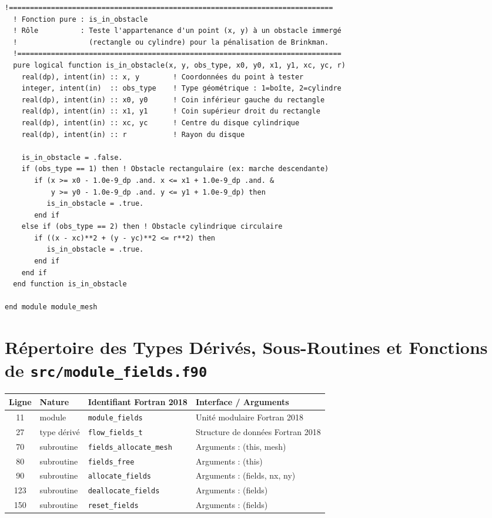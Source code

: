 \documentclass[10pt,a4paper,oneside]{book}
\begin{document}
\begin{lstlisting}[language={[95]Fortran}]
  !=============================================================================
  ! Fonction pure : is_in_obstacle
  ! Rôle          : Teste l'appartenance d'un point (x, y) à un obstacle immergé
  !                 (rectangle ou cylindre) pour la pénalisation de Brinkman.
  !=============================================================================
  pure logical function is_in_obstacle(x, y, obs_type, x0, y0, x1, y1, xc, yc, r)
    real(dp), intent(in) :: x, y        ! Coordonnées du point à tester
    integer, intent(in)  :: obs_type    ! Type géométrique : 1=boîte, 2=cylindre
    real(dp), intent(in) :: x0, y0      ! Coin inférieur gauche du rectangle
    real(dp), intent(in) :: x1, y1      ! Coin supérieur droit du rectangle
    real(dp), intent(in) :: xc, yc      ! Centre du disque cylindrique
    real(dp), intent(in) :: r           ! Rayon du disque

    is_in_obstacle = .false.
    if (obs_type == 1) then ! Obstacle rectangulaire (ex: marche descendante)
       if (x >= x0 - 1.0e-9_dp .and. x <= x1 + 1.0e-9_dp .and. &
           y >= y0 - 1.0e-9_dp .and. y <= y1 + 1.0e-9_dp) then
          is_in_obstacle = .true.
       end if
    else if (obs_type == 2) then ! Obstacle cylindrique circulaire
       if ((x - xc)**2 + (y - yc)**2 <= r**2) then
          is_in_obstacle = .true.
       end if
    end if
  end function is_in_obstacle

end module module_mesh

\end{lstlisting}

\section{Répertoire des Types Dérivés, Sous-Routines et Fonctions de \texttt{src/module\_fields.f90}}
\begin{center}\small
\begin{tabular}{clll}
\toprule
\textbf{Ligne} & \textbf{Nature} & \textbf{Identifiant Fortran 2018} & \textbf{Interface / Arguments} \\
\midrule
11 & module & \texttt{module\_fields} & Unité modulaire Fortran 2018 \\
27 & type dérivé & \texttt{flow\_fields\_t} & Structure de données Fortran 2018 \\
70 & subroutine & \texttt{fields\_allocate\_mesh} & Arguments : (this, mesh) \\
80 & subroutine & \texttt{fields\_free} & Arguments : (this) \\
90 & subroutine & \texttt{allocate\_fields} & Arguments : (fields, nx, ny) \\
123 & subroutine & \texttt{deallocate\_fields} & Arguments : (fields) \\
150 & subroutine & \texttt{reset\_fields} & Arguments : (fields) \\
\bottomrule
\end{tabular}
\end{center}
\end{document}
